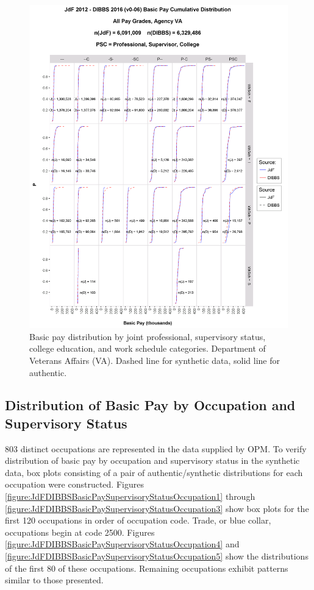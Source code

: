 \documentclass[10pt, letterpaper]{article}
\begin{document}
\begin{spacing}{1.0}
\begin{figure}[h]
    \centering
    \includegraphics[width=6.5in, trim={0 0 1in 1.5in}, clip]{JdFDIBBSBasicPayCDFVA.png}
    \caption{Basic pay distribution by joint professional, supervisory status, college education, and work schedule  categories.  Department of Veterans Affairs (VA).  Dashed line for synthetic data, solid line for authentic.}
    \label{figure:JdFDIBBSBasicPayCDFVA}
\end{figure}

\clearpage

\subsection{Distribution of Basic Pay by Occupation and Supervisory Status}

803 distinct occupations are represented in the data supplied by OPM.  To verify distribution of basic pay by occupation and supervisory status in the synthetic data, box plots consisting of a pair of authentic/synthetic distributions for each occupation were constructed.  Figures \ref{figure:JdFDIBBSBasicPaySupervisoryStatusOccupation1} through \ref{figure:JdFDIBBSBasicPaySupervisoryStatusOccupation3} show box plots for the first 120 occupations in order of occupation code.  Trade, or blue collar, occupations begin at code 2500.  Figures \ref{figure:JdFDIBBSBasicPaySupervisoryStatusOccupation4} and \ref{figure:JdFDIBBSBasicPaySupervisoryStatusOccupation5} show the distributions of the first 80 of these occupations.  Remaining occupations exhibit patterns similar to those presented.\\


\end{spacing}
\end{document}
